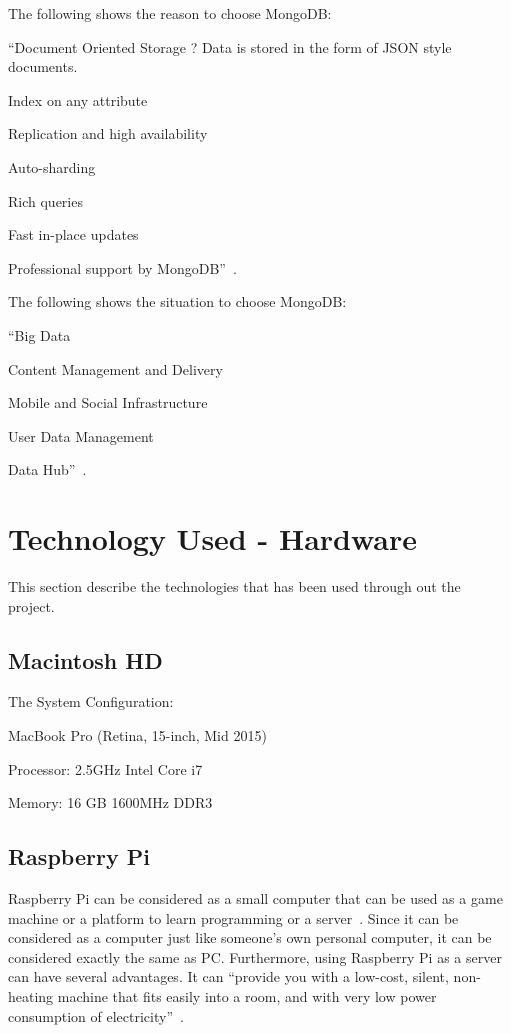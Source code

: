The following shows the reason to choose MongoDB:

``Document Oriented Storage ? Data is stored in the form of 
JSON style documents.

Index on any attribute

Replication and high availability

Auto-sharding

Rich queries

Fast in-place updates

Professional support by MongoDB''~\cite{hid-sp18-508-mon}. 


The following shows the situation to choose MongoDB:

``Big Data

Content Management and Delivery

Mobile and Social Infrastructure

User Data Management

Data Hub''~\cite{hid-sp18-508-mon}. 



\section{Technology Used - Hardware}
This section describe the technologies that has been used through out 
the project.

\subsection{Macintosh HD}
The System Configuration:

MacBook Pro (Retina, 15-inch, Mid 2015)

Processor: 2.5GHz Intel Core i7

Memory: 16 GB 1600MHz DDR3


\subsection{Raspberry Pi}
Raspberry Pi can be considered as a small computer that can be used 
as a game machine or a platform to learn programming or a 
server~\cite{hid-sp18-508-raspberryPi}. Since it can be considered as a
computer just like someone's own personal computer, it can be considered 
exactly the same as PC. Furthermore, using Raspberry Pi as a server can
have  several advantages. It can ``provide you with a low-cost, silent, 
non-heating
 machine that fits easily into a room, and with very low power consumption of
 electricity''~\cite{hid-sp18-508-raspberryServer}.

